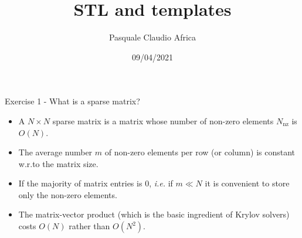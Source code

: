 \documentclass[10pt]{beamer}
\begin{document}
    \title{STL and templates}
    \author{Pasquale Claudio Africa}
    \date{09/04/2021}

\begin{frame}
    \maketitle
\end{frame}


\begin{frame}{Exercise 1 - What is a sparse matrix?}
\begin{itemize}
\item A $N \times N$ sparse matrix is a matrix whose number of non-zero elements $N_\mathrm{nz}$ is $O(N)$. \\[3mm]
\item The average number $m$ of non-zero elements per row (or column)
is constant w.r.to the matrix size. \\[3mm]
\item If the majority of matrix entries is $0$, {\it i.e.} if $m \ll N$ it is convenient to store only the non-zero elements.\\[3mm]
\item The matrix-vector product (which is the basic ingredient of Krylov solvers) costs $O(N)$ rather than $O(N^{2})$.\\[3mm]
\end{itemize}
\end{frame}
\end{document}
